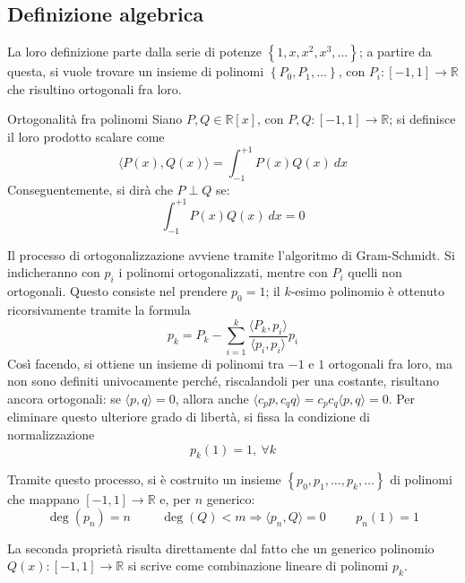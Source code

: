 \documentclass[11pt, a4paper]{scrartcl}
\theoremstyle{definition}
\numberwithin{esempio}{section}
\theoremstyle{definition}
\numberwithin{obs}{section}
\numberwithin{nota}{section}
\newenvironment{boxenv}[1][]{
    \begin{eqbox}[#1]
    }{
   \end{eqbox}
}
\numberwithin{equation}{subsection}
\begin{document}
\subsection{Definizione algebrica}
La loro definizione parte dalla serie di potenze $\left\{ 1,x,x^2,x^3,\ldots \right\} $; a partire da questa, si vuole trovare un insieme di polinomi $\left\{ P_0, P_1,\ldots \right\} $, con $P_i:\left[ -1,1 \right] \to \mathbb{R}$ che risultino ortogonali fra loro.
\begin{definizione}
	{Ortogonalit\`a fra polinomi}{}
	Siano $P, Q\in \mathbb{R}[x]$, con $P,Q:[-1,1]\to \mathbb{R}$; si definisce il loro prodotto scalare come
	\begin{equation}
		\langle P(x) ,Q(x) \rangle = \int_{-1} ^{+1} P(x) Q(x) \ dx 
	\end{equation}
	Conseguentemente, si dir\`a che $P \perp Q$ se:
	\begin{equation}
		\int_{-1} ^{+1} P(x) Q(x) \ dx = 0
	\end{equation}
\end{definizione}
Il processo di ortogonalizzazione avviene tramite l'algoritmo di Gram-Schmidt.
Si indicheranno con $p_i$ i polinomi ortogonalizzati, mentre con $P_i$ quelli non ortogonali.
Questo consiste nel prendere $p_0 = 1$; il $k$-esimo polinomio \`e ottenuto ricorsivamente tramite la formula
\begin{equation}
	p_k = P_k - \sum_{i=1}^{k} \frac{\langle P_k, p_i \rangle}{\langle p_i , p_i \rangle}p_i
\end{equation}
Cos\`i facendo, si ottiene un insieme di polinomi tra $-1$ e $1$ ortogonali fra loro, ma non sono definiti univocamente perch\'e, riscalandoli per una costante, risultano ancora ortogonali: se $\langle p,q \rangle=0$, allora anche $\langle c_pp,c_q q \rangle=c_pc_q\langle p,q \rangle=0$.
Per eliminare questo ulteriore grado di libert\`a, si fissa la condizione di normalizzazione 
\begin{equation}
	p_k(1) = 1, \ \forall k
\end{equation}
\begin{boxenv}[]
	Tramite questo processo, si \`e costruito un insieme $\left\{ p_0,p_1,\ldots,p_k,\ldots \right\} $ di polinomi che mappano $[-1,1] \to \mathbb{R}$ e, per $n$ generico:
	\begin{equation}
		\operatorname{deg} (p_n) = n \hspace{1cm} \operatorname{deg} (Q) < m \Rightarrow  \langle p_n, Q \rangle =0 \hspace{1cm} p_n(1) = 1
	\end{equation}
\end{boxenv}
La seconda propriet\`a risulta direttamente dal fatto che un generico polinomio $Q(x):\left[ -1,1 \right] \to \mathbb{R}$ si scrive come combinazione lineare di polinomi $ p_k $.
\end{document}
